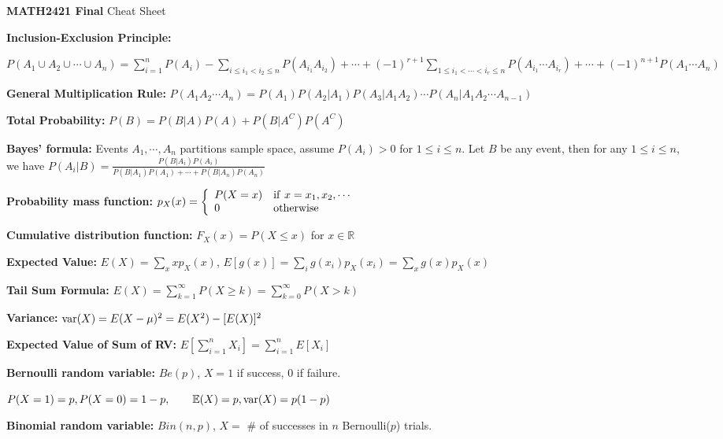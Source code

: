\documentclass[10pt, a4paper]{article}
\newcommand{\E}{{\mathbb{E}}}
\newcommand{\var}{{\rm var}}
\newcommand{\disp}{\displaystyle}
\begin{document}
\begin{spacing}{1}
    \begin{center}
        {\bf MATH2421 Final} Cheat Sheet
    \end{center}
    \setlength{\parindent}{0em}
    \parskip=6pt

    \normalsize
    {\bf Inclusion-Exclusion Principle:} 

    $\disp P(A_1\cup A_2\cup \cdots \cup A_n)=
    \sum_{i=1}^{n}P(A_i)-\sum_{i\le i_1<i_2\le n}P(A_{i_1}A_{i_2})+\cdots +
    (-1)^{r+1}\sum_{1\le i_1<\cdots<i_r\le n}P(A_{i_1}\cdots A_{i_r})+\cdots +
    (-1)^{n+1}P(A_1\cdots A_n)$

    {\bf General Multiplication Rule:} $P(A_1A_2\cdots A_n)=
    P(A_1)P(A_2|A_1)P(A_3|A_1A_2)\cdots P(A_n|A_1A_2\cdots A_{n-1})$

    {\bf Total Probability:} $P(B)=P(B|A)P(A)+P(B|A^C)P(A^C)$

    {\bf Bayes' formula:} Events $A_1,\cdots ,A_n$ partitions sample space, assume 
    $P(A_i)>0$ for $1\le i\le n$. Let $B$ be any event, then for any $1\le i\le n$, we have
    $\disp P(A_i|B)=\frac{P(B|A_i)P(A_i)}{P(B|A_1)P(A_1)+\cdots +P(B|A_n)P(A_n)}$

    \vspace{0.3in}
    {\bf Probability mass function:} $\disp p_X(x)=
    \left\{ \begin{array}{ll} 
        P(X=x) & {\rm if\ } x=x_1,x_2,\cdots \\ 0 & {\rm otherwise}
    \end{array} \right.$

    {\bf Cumulative distribution function:} $F_X(x)=P(X\le x)$ for $x\in \mathbb{R}$

    {\bf Expected Value:} $\disp E(X)=\sum_{x} xp_X(x)$, 
    $\disp E[g(x)]=\sum_{i}g(x_i)p_X(x_i)=\sum_x g(x)p_X(x)$

    {\bf Tail Sum Formula:} $\disp E(X)=\sum_{k=1}^{\infty} P(X\ge k)=\sum_{k=0}^{\infty}P(X>k)$

    {\bf Variance:} $\var (X)=E(X-\mu)^2=E(X^2)-[E(X)]^2$

    {\bf Expected Value of Sum of RV:} $\disp E\left[\sum_{i=1}^n X_i\right]
    =\sum_{i=1}^n E[X_i]$

    \vspace{0.3in}
    {\bf Bernoulli random variable:} $Be(p)$, $X=1$ if success, $0$ if failure. 

    $P(X=1)=p, P(X=0)=1-p,\qquad \E(X)=p, \var(X)=p(1-p)$

    {\bf Binomial random variable:} $Bin(n,p)$, $X=$ \# of successes in $n$ 
    Bernoulli($p$) trials.


\end{spacing}
\end{document}
